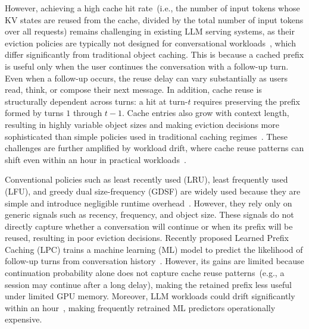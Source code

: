 \documentclass{article}
\begin{document}
However, achieving a high cache hit rate~(i.e., the number of input tokens whose KV states are reused from the cache, divided by the total number of input tokens over all requests) remains challenging in existing LLM serving systems, as their eviction policies are typically not designed for conversational workloads~\cite{vllm, sglang}, which differ significantly from traditional object caching. This is because a cached prefix is useful only when the user continues the conversation with a follow-up turn. Even when a follow-up occurs, the reuse delay can vary substantially as users read, think, or compose their next message. In addition, cache reuse is structurally dependent across turns: a hit at turn-\(t\) requires preserving the prefix formed by turns \(1\) through \(t-1\). Cache entries also grow with context length, resulting in highly variable object sizes and making eviction decisions more sophisticated than simple policies used in traditional caching regimes~\cite{cherkasova1998improving,246346}. These challenges are further amplified by workload drift, where cache reuse patterns can shift even within an hour in practical workloads~\cite{wang2025kvcache}.

Conventional policies such as least recently used (LRU), least frequently used (LFU), and greedy dual size-frequency (GDSF) are widely used because they are simple and introduce negligible runtime overhead~\cite{vllm,sglang,wang2025kvcache}. However, they rely only on generic signals such as recency, frequency, and object size. These signals do not directly capture whether a conversation will continue or when its prefix will be reused, resulting in poor eviction decisions. 
Recently proposed Learned Prefix Caching (LPC) trains a machine learning (ML) model to predict the likelihood of follow-up turns from conversation history~\cite{yanglearned}. However, its gains are limited because continuation probability alone does not capture cache reuse patterns~(e.g., a session may continue after a long delay), making the retained prefix less useful under limited GPU memory. Moreover, LLM workloads could drift significantly within an hour~\cite{wang2025kvcache}, making frequently retrained ML predictors operationally expensive.
\end{document}

